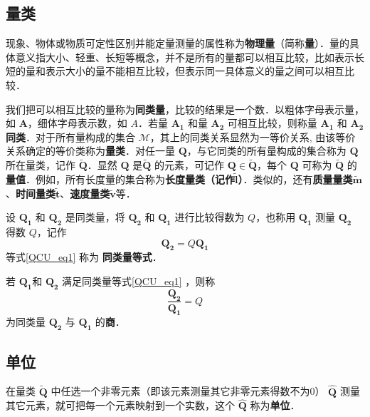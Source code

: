 \subsection{量类}
现象、物体或物质可定性区别并能定量测量的属性称为\textbf{物理量}（简称\textbf{量}）．量的具体意义指大小、轻重、长短等概念，并不是所有的量都可以相互比较，比如表示长短的量和表示大小的量不能相互比较，但表示同一具体意义的量之间可以相互比较．

我们把可以相互比较的量称为\textbf{同类量}，比较的结果是一个数．以粗体字母表示量，如 $\boldsymbol{A}$，细体字母表示数，如 $A$．若量 $\boldsymbol{A_1}$ 和量 $\boldsymbol{A_2}$ 可相互比较，则称量 $\boldsymbol{A_1}$ 和 $\boldsymbol{A_2}$ \textbf{同类}．对于所有量构成的集合 $\mathcal{M}$，其上的同类关系显然为一等价关系, 由该等价关系确定的等价类称为\textbf{量类}．对任一量 $\boldsymbol{Q}$，与它同类的所有量构成的集合称为 $\boldsymbol{Q}$ 所在量类，记作 $\widetilde{\boldsymbol{Q}}$．显然 $\boldsymbol{Q}$ 是$\widetilde{\boldsymbol{Q}}$ 的元素，可记作 $\boldsymbol{Q}\in \widetilde{\boldsymbol{Q}}$，每个 $\boldsymbol{Q}$ 可称为 $\widetilde{\boldsymbol{Q}}$ 的\textbf{量值}．例如，所有长度量的集合称为\textbf{长度量类（记作$\widetilde{\boldsymbol{l}}$）}．类似的，还有\textbf{质量量类}$\widetilde{\boldsymbol{m}}$、\textbf{时间量类}$\widetilde{\boldsymbol{t}}$、\textbf{速度量类}$\widetilde{\boldsymbol{v}}$等．

设 $\boldsymbol{Q_1}$ 和 $\boldsymbol{Q_2}$ 是同类量，将 $\boldsymbol{Q_2}$ 和 $\boldsymbol{Q_1}$ 进行比较得数为 $Q$，也称用 $\boldsymbol{Q_1}$ 测量 $\boldsymbol{Q_2}$ 得数 $Q$，记作
\begin{equation}\label{QCU_eq1}
\boldsymbol{Q_2}=Q\boldsymbol{Q_1}
\end{equation}
等式\autoref{QCU_eq1} 称为 \textbf{同类量等式}．
\begin{definition}{}
若 $\boldsymbol{Q_1}$和 $\boldsymbol{Q_2}$ 满足同类量等式\autoref{QCU_eq1} ，则称
\begin{equation}\label{QCU_eq4}
\frac{\boldsymbol{Q_2}}{\boldsymbol{Q_1}}=Q
\end{equation}
为同类量 $\boldsymbol{Q_2}$ 与 $\boldsymbol{Q_1}$ 的\textbf{商}．
\end{definition}
\subsection{单位}
在量类 $\widetilde{\boldsymbol{Q}}$ 中任选一个非零元素（即该元素测量其它非零元素得数不为0） $\hat{\boldsymbol{Q}}$ 测量其它元素，就可把每一个元素映射到一个实数，这个 $\hat{\boldsymbol{Q}}$ 称为\textbf{单位}．

